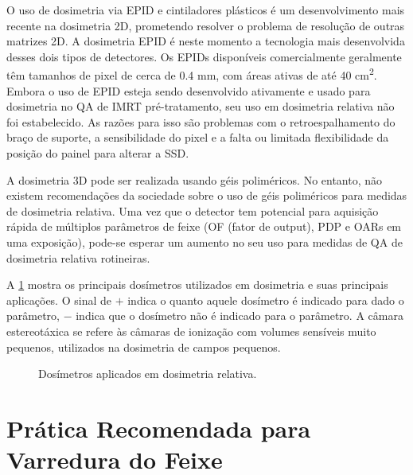 \documentclass[11pt,a4paper]{article}
\begin{document}
	O uso de dosimetria via EPID e cintiladores plásticos é um desenvolvimento mais recente na dosimetria 2D, prometendo resolver o problema de resolução de outras matrizes 2D. A dosimetria EPID é neste momento a tecnologia mais desenvolvida desses dois tipos de detectores. Os EPIDs disponíveis comercialmente geralmente têm tamanhos de pixel de cerca de 0.4 mm, com áreas ativas de até 40 \unit{cm^2}. Embora o uso de EPID esteja sendo desenvolvido ativamente e usado para dosimetria no QA de IMRT pré-tratamento, seu uso em dosimetria relativa não foi estabelecido. As razões para isso são problemas com o retroespalhamento do braço de suporte, a sensibilidade do pixel e a falta ou limitada flexibilidade da posição do painel para alterar a SSD.

	A dosimetria 3D pode ser realizada usando géis poliméricos. No entanto, não existem recomendações da sociedade sobre o uso de géis poliméricos para medidas de dosimetria relativa. Uma vez que o detector tem potencial para aquisição rápida de múltiplos parâmetros de feixe (OF (fator de output), PDP e OARs  em uma exposição), pode-se esperar um aumento no seu uso para medidas de QA de dosimetria relativa rotineiras.

	A \ref{fig:dosimetrosDosimetriaRelativa} mostra os principais dosímetros utilizados em dosimetria e suas principais aplicações. O sinal de $+$ indica o quanto aquele dosímetro é indicado para dado o parâmetro, $-$ indica que o dosímetro não é indicado para o parâmetro. A câmara estereotáxica se refere às câmaras de ionização com volumes sensíveis muito pequenos, utilizados na dosimetria de campos pequenos.

	\begin{figure}[h]
		\centering
		\caption{Dosímetros aplicados em dosimetria relativa.}
		\label{fig:dosimetrosDosimetriaRelativa}
	\end{figure}


\section{Prática Recomendada para Varredura do Feixe}
\end{document}
